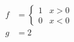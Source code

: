 \begin{align}
  f & = \begin{cases}
    1 & x > 0 \\
    0 & x < 0
  \end{cases} \\
  g & = 2
\end{align}
